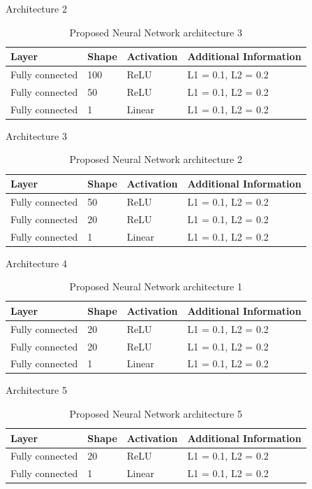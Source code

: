 \documentclass{article}
\begin{document}
Architecture 2

\begin{table}[!htb]
\centering
\begin{tabular}{l l l l}
	\hline
	Layer & Shape & Activation & Additional Information\\
  	\hline
  	Fully connected & 100 & ReLU & L1 = 0.1, L2 = 0.2\\
  	Fully connected & 50 & ReLU & L1 = 0.1, L2 = 0.2\\
  	Fully connected & 1 & Linear & L1 = 0.1, L2 = 0.2\\
  	\hline
\end{tabular}
\caption{Proposed Neural Network architecture 3}
\label{table:proposed_nn_3}
\end{table}

Architecture 3

\begin{table}[!htb]
\centering
\begin{tabular}{l l l l}
	\hline
	Layer & Shape & Activation & Additional Information\\
  	\hline
  	Fully connected & 50 & ReLU & L1 = 0.1, L2 = 0.2\\
  	Fully connected & 20 & ReLU & L1 = 0.1, L2 = 0.2\\
  	Fully connected & 1 & Linear & L1 = 0.1, L2 = 0.2\\
  	\hline
\end{tabular}
\caption{Proposed Neural Network architecture 2}
\label{table:proposed_nn_2}
\end{table}

Architecture 4

\begin{table}[!htb]
\centering
\begin{tabular}{l l l l}
	\hline
	Layer & Shape & Activation & Additional Information\\
  	\hline
  	Fully connected & 20 & ReLU & L1 = 0.1, L2 = 0.2\\
  	Fully connected & 20 & ReLU & L1 = 0.1, L2 = 0.2\\
  	Fully connected & 1 & Linear & L1 = 0.1, L2 = 0.2\\
  	\hline
\end{tabular}
\caption{Proposed Neural Network architecture 1}
\label{table:proposed_nn_1}
\end{table}

Architecture 5

\begin{table}[!htb]
\centering
\begin{tabular}{l l l l}
	\hline
	Layer & Shape & Activation & Additional Information\\
  	\hline
  	Fully connected & 20 & ReLU & L1 = 0.1, L2 = 0.2\\
  	Fully connected & 1 & Linear & L1 = 0.1, L2 = 0.2\\
  	\hline
\end{tabular}
\caption{Proposed Neural Network architecture 5}
\label{table:proposed_nn_5}
\end{table}
\end{document}
